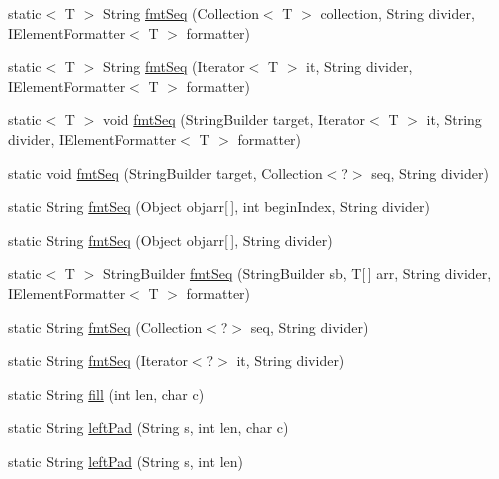 \begin{DoxyCompactItemize}
\item 
static$<$ T $>$ String \hyperlink{classorg_1_1tzi_1_1use_1_1util_1_1_string_util_a3a4b41583aba38bd29c321e53e900931}{fmt\-Seq} (Collection$<$ T $>$ collection, String divider, I\-Element\-Formatter$<$ T $>$ formatter)
\item 
static$<$ T $>$ String \hyperlink{classorg_1_1tzi_1_1use_1_1util_1_1_string_util_a1499c99ec4120d66aa000a2bcdfa46f0}{fmt\-Seq} (Iterator$<$ T $>$ it, String divider, I\-Element\-Formatter$<$ T $>$ formatter)
\item 
static$<$ T $>$ void \hyperlink{classorg_1_1tzi_1_1use_1_1util_1_1_string_util_ac1b915fd41251ffc87cfe3334d12591d}{fmt\-Seq} (String\-Builder target, Iterator$<$ T $>$ it, String divider, I\-Element\-Formatter$<$ T $>$ formatter)
\item 
static void \hyperlink{classorg_1_1tzi_1_1use_1_1util_1_1_string_util_a618ffea827bddfa503b7d92e3cb8a085}{fmt\-Seq} (String\-Builder target, Collection$<$?$>$ seq, String divider)
\item 
static String \hyperlink{classorg_1_1tzi_1_1use_1_1util_1_1_string_util_ab10ad571e96965318f21ce5b62781a9e}{fmt\-Seq} (Object objarr\mbox{[}$\,$\mbox{]}, int begin\-Index, String divider)
\item 
static String \hyperlink{classorg_1_1tzi_1_1use_1_1util_1_1_string_util_afcc2be135d0fd666c7610af165253ad2}{fmt\-Seq} (Object objarr\mbox{[}$\,$\mbox{]}, String divider)
\item 
static$<$ T $>$ String\-Builder \hyperlink{classorg_1_1tzi_1_1use_1_1util_1_1_string_util_a868f2865d01ac41a6f09942b5dec31f5}{fmt\-Seq} (String\-Builder sb, T\mbox{[}$\,$\mbox{]} arr, String divider, I\-Element\-Formatter$<$ T $>$ formatter)
\item 
static String \hyperlink{classorg_1_1tzi_1_1use_1_1util_1_1_string_util_a235e63b4ec82420f9ee1c387e5c6e333}{fmt\-Seq} (Collection$<$?$>$ seq, String divider)
\item 
static String \hyperlink{classorg_1_1tzi_1_1use_1_1util_1_1_string_util_af467b3b96549fb1ef457f237b36a8c5a}{fmt\-Seq} (Iterator$<$?$>$ it, String divider)
\item 
static String \hyperlink{classorg_1_1tzi_1_1use_1_1util_1_1_string_util_a30296d15ad46fc65daca1ccf792f37d8}{fill} (int len, char c)
\item 
static String \hyperlink{classorg_1_1tzi_1_1use_1_1util_1_1_string_util_a57717f37c315a39aa7eea3568ffdc020}{left\-Pad} (String s, int len, char c)
\item 
static String \hyperlink{classorg_1_1tzi_1_1use_1_1util_1_1_string_util_a2827a5f57ccc21352334764f27832d6b}{left\-Pad} (String s, int len)

\end{DoxyCompactItemize}
